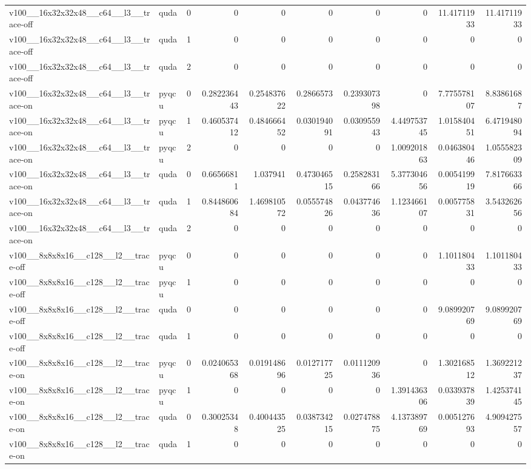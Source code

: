\begin{table}[htbp]
\begin{tabular}{@{}llrrrrrrrr@{}}
v100\_\_16x32x32x48\_\_c64\_\_l3\_\_trace-off & quda & 0 & 0 & 0 & 0 & 0 & 0 & 11.41711933 & 11.41711933 \\
v100\_\_16x32x32x48\_\_c64\_\_l3\_\_trace-off & quda & 1 & 0 & 0 & 0 & 0 & 0 & 0 & 0 \\
v100\_\_16x32x32x48\_\_c64\_\_l3\_\_trace-off & quda & 2 & 0 & 0 & 0 & 0 & 0 & 0 & 0 \\
v100\_\_16x32x32x48\_\_c64\_\_l3\_\_trace-on & pyqcu & 0 & 0.282236443 & 0.254837622 & 0.2866573 & 0.239307398 & 0 & 7.775578107 & 8.83861687 \\
v100\_\_16x32x32x48\_\_c64\_\_l3\_\_trace-on & pyqcu & 1 & 0.460537412 & 0.484666452 & 0.030194091 & 0.030955943 & 4.449753745 & 1.015840451 & 6.471948094 \\
v100\_\_16x32x32x48\_\_c64\_\_l3\_\_trace-on & pyqcu & 2 & 0 & 0 & 0 & 0 & 1.009201863 & 0.046380446 & 1.055582309 \\
v100\_\_16x32x32x48\_\_c64\_\_l3\_\_trace-on & quda & 0 & 0.66566811 & 1.037941 & 0.473046515 & 0.258283166 & 5.377304656 & 0.005419919 & 7.817663366 \\
v100\_\_16x32x32x48\_\_c64\_\_l3\_\_trace-on & quda & 1 & 0.844860684 & 1.469810572 & 0.055574826 & 0.043774636 & 1.123466107 & 0.005775831 & 3.543262656 \\
v100\_\_16x32x32x48\_\_c64\_\_l3\_\_trace-on & quda & 2 & 0 & 0 & 0 & 0 & 0 & 0 & 0 \\
v100\_\_8x8x8x16\_\_c128\_\_l2\_\_trace-off & pyqcu & 0 & 0 & 0 & 0 & 0 & 0 & 1.101180433 & 1.101180433 \\
v100\_\_8x8x8x16\_\_c128\_\_l2\_\_trace-off & pyqcu & 1 & 0 & 0 & 0 & 0 & 0 & 0 & 0 \\
v100\_\_8x8x8x16\_\_c128\_\_l2\_\_trace-off & quda & 0 & 0 & 0 & 0 & 0 & 0 & 9.089920769 & 9.089920769 \\
v100\_\_8x8x8x16\_\_c128\_\_l2\_\_trace-off & quda & 1 & 0 & 0 & 0 & 0 & 0 & 0 & 0 \\
v100\_\_8x8x8x16\_\_c128\_\_l2\_\_trace-on & pyqcu & 0 & 0.024065368 & 0.019148696 & 0.012717725 & 0.011120936 & 0 & 1.302168512 & 1.369221237 \\
v100\_\_8x8x8x16\_\_c128\_\_l2\_\_trace-on & pyqcu & 1 & 0 & 0 & 0 & 0 & 1.391436306 & 0.033937839 & 1.425374145 \\
v100\_\_8x8x8x16\_\_c128\_\_l2\_\_trace-on & quda & 0 & 0.30025348 & 0.400443525 & 0.038734215 & 0.027478875 & 4.137389769 & 0.005127693 & 4.909427557 \\
v100\_\_8x8x8x16\_\_c128\_\_l2\_\_trace-on & quda & 1 & 0 & 0 & 0 & 0 & 0 & 0 & 0 \\

\end{tabular}
\end{table}
